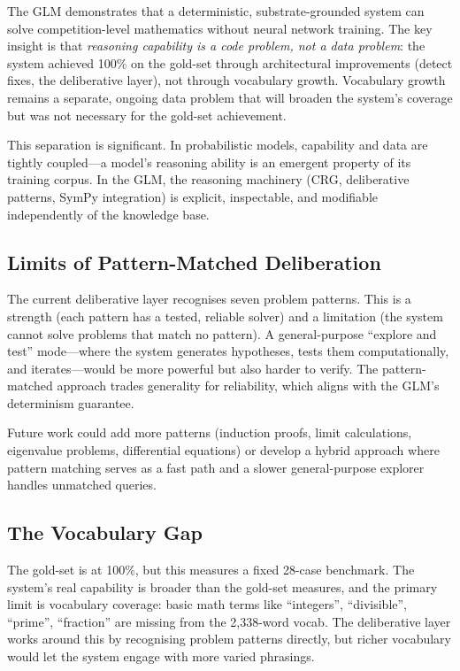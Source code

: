 \documentclass[11pt,a4paper]{article}
\begin{document}
The GLM demonstrates that a deterministic, substrate-grounded system can solve competition-level mathematics without neural network training. The key insight is that \emph{reasoning capability is a code problem, not a data problem}: the system achieved 100\% on the gold-set through architectural improvements (detect fixes, the deliberative layer), not through vocabulary growth. Vocabulary growth remains a separate, ongoing data problem that will broaden the system's coverage but was not necessary for the gold-set achievement.

This separation is significant. In probabilistic models, capability and data are tightly coupled---a model's reasoning ability is an emergent property of its training corpus. In the GLM, the reasoning machinery (CRG, deliberative patterns, SymPy integration) is explicit, inspectable, and modifiable independently of the knowledge base.

\subsection{Limits of Pattern-Matched Deliberation}

The current deliberative layer recognises seven problem patterns. This is a strength (each pattern has a tested, reliable solver) and a limitation (the system cannot solve problems that match no pattern). A general-purpose ``explore and test'' mode---where the system generates hypotheses, tests them computationally, and iterates---would be more powerful but also harder to verify. The pattern-matched approach trades generality for reliability, which aligns with the GLM's determinism guarantee.

Future work could add more patterns (induction proofs, limit calculations, eigenvalue problems, differential equations) or develop a hybrid approach where pattern matching serves as a fast path and a slower general-purpose explorer handles unmatched queries.

\subsection{The Vocabulary Gap}

The gold-set is at 100\%, but this measures a fixed 28-case benchmark. The system's real capability is broader than the gold-set measures, and the primary limit is vocabulary coverage: basic math terms like ``integers'', ``divisible'', ``prime'', ``fraction'' are missing from the 2,338-word vocab. The deliberative layer works around this by recognising problem patterns directly, but richer vocabulary would let the system engage with more varied phrasings.
\end{document}
